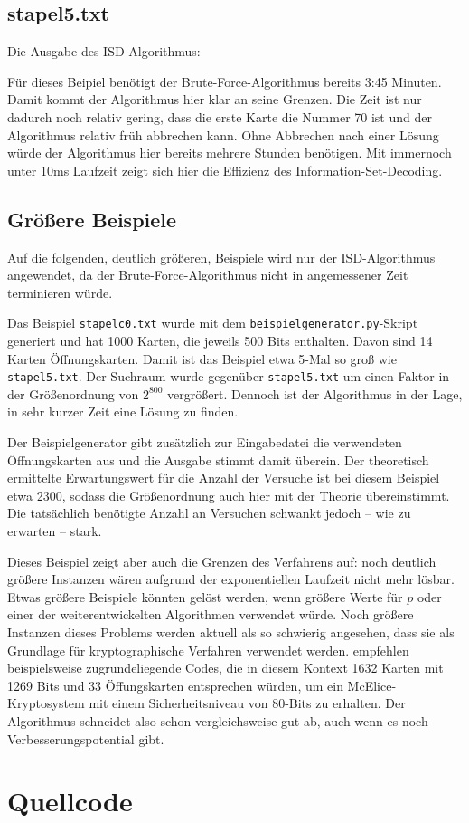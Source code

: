 \documentclass[a4paper,10pt,ngerman]{scrartcl}
\begin{document}
\subsection*{stapel5.txt}
Die Ausgabe des ISD-Algorithmus:

Für dieses Beipiel benötigt der Brute-Force-Algorithmus bereits 3:45 Minuten. Damit kommt der Algorithmus hier klar an seine Grenzen. Die Zeit ist nur dadurch noch relativ gering, dass die erste Karte die Nummer 70 ist und der Algorithmus relativ früh abbrechen kann. Ohne Abbrechen nach einer Lösung würde der Algorithmus hier bereits mehrere Stunden benötigen.
Mit immernoch unter 10ms Laufzeit zeigt sich hier die Effizienz des Information-Set-Decoding.
\subsection{Größere Beispiele}
Auf die folgenden, deutlich größeren, Beispiele wird nur der ISD-Algorithmus angewendet, da der Brute-Force-Algorithmus nicht in angemessener Zeit terminieren würde.

Das Beispiel \lstinline{stapelc0.txt} wurde mit dem \lstinline{beispielgenerator.py}-Skript generiert und hat 1000 Karten, die jeweils 500 Bits enthalten. Davon sind 14 Karten Öffnungskarten. Damit ist das Beispiel etwa 5-Mal so groß wie \lstinline{stapel5.txt}. Der Suchraum wurde gegenüber \lstinline{stapel5.txt} um einen Faktor in der Größenordnung von $2^{800}$ vergrößert. Dennoch ist der Algorithmus in der Lage, in sehr kurzer Zeit eine Lösung zu finden.

Der Beispielgenerator gibt zusätzlich zur Eingabedatei die verwendeten Öffnungskarten aus und die Ausgabe stimmt damit überein. 
Der theoretisch ermittelte Erwartungswert für die Anzahl der Versuche ist bei diesem Beispiel etwa 2300, sodass die Größenordnung auch hier mit der Theorie übereinstimmt. Die tatsächlich benötigte Anzahl an Versuchen schwankt jedoch -- wie zu erwarten -- stark.

Dieses Beispiel zeigt aber auch die Grenzen des Verfahrens auf: noch deutlich größere Instanzen wären aufgrund der exponentiellen Laufzeit nicht mehr lösbar. Etwas größere Beispiele könnten gelöst werden, wenn größere Werte für $p$ oder einer der weiterentwickelten Algorithmen verwendet würde.
Noch größere Instanzen dieses Problems werden aktuell als so schwierig angesehen, dass sie als Grundlage für kryptographische Verfahren verwendet werden. \citeauthor{bernsteinAttackingDefendingMcEliece2008} empfehlen beispielsweise zugrundeliegende Codes, die in diesem Kontext 1632 Karten mit 1269 Bits und 33 Öffungskarten entsprechen würden, um ein McElice-Kryptosystem mit einem Sicherheitsniveau von 80-Bits zu erhalten. \cite{bernsteinAttackingDefendingMcEliece2008}
Der Algorithmus schneidet also schon vergleichsweise gut ab, auch wenn es noch Verbesserungspotential gibt.
\section{Quellcode}



\printbibliography[heading=bibintoc]
\end{document}
